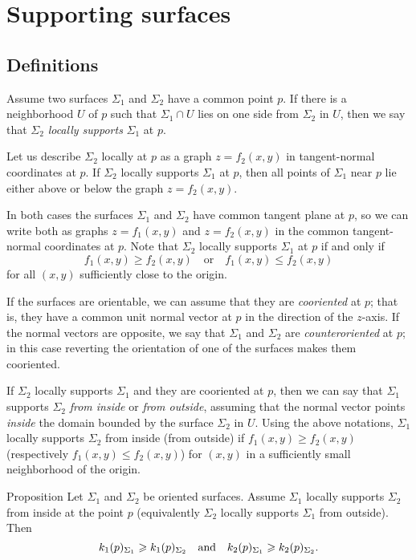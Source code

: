 \chapter{Supporting surfaces}
\label{chap:surface-support}

\section{Definitions}

Assume two surfaces $\Sigma_1$ and $\Sigma_2$ have a common point $p$.
If there is a neighborhood $U$ of $p$ such that $\Sigma_1\cap U$ lies on one side from $\Sigma_2$ in $U$, then we say that $\Sigma_2$ \emph{locally supports} $\Sigma_1$ at $p$.

Let us describe $\Sigma_2$ locally at $p$ as a graph $z=f_2(x,y)$ in tangent-normal coordinates at $p$.
If $\Sigma_2$ locally supports $\Sigma_1$ at $p$, then  all points of $\Sigma_1$ near $p$ lie either above or below the graph $z=f_2(x,y)$.

In both cases the surfaces $\Sigma_1$ and $\Sigma_2$ have common tangent plane at $p$,
so we can write both as graphs $z=f_1(x,y)$ and $z=f_2(x,y)$ in the common tangent-normal coordinates at $p$.
Note that $\Sigma_2$ locally supports $\Sigma_1$ at $p$ if and only if 
\[f_1(x,y)\ge f_2(x,y)
\quad\text{or}\quad
f_1(x,y)\le f_2(x,y)\]
for all $(x,y)$ sufficiently close to the origin.

If the surfaces are orientable, we can assume that they are \emph{cooriented} at $p$;
that is, they have a common unit normal vector at $p$ in the direction of the $z$-axis.
If the normal vectors are opposite, we say that $\Sigma_1$ and $\Sigma_2$ are \emph{counteroriented} at $p$;
in this case reverting the orientation of one of the surfaces makes them cooriented.

If $\Sigma_2$ locally supports $\Sigma_1$ and they are cooriented at $p$,
then we can say that $\Sigma_1$ supports $\Sigma_2$ \emph{from inside} or \emph{from outside},
assuming that the normal vector points {}\emph{inside} the domain bounded by the surface $\Sigma_2$ in $U$.
Using the above notations, $\Sigma_1$ locally supports $\Sigma_2$ from inside (from outside)  if $f_1(x,y)\ge f_2(x,y)$ (respectively $f_1(x,y)\le f_2(x,y)$) for $(x,y)$ in a sufficiently small neighborhood of the origin.

\begin{thm}{Proposition}\label{prop:surf-support}
Let $\Sigma_1$ and $\Sigma_2$ be oriented surfaces.
Assume $\Sigma_1$ locally supports $\Sigma_2$ from inside at the point $p$ (equivalently $\Sigma_2$ locally supports $\Sigma_1$ from outside).
Then 
\[k_1(p)_{\Sigma_1}\ge k_1(p)_{\Sigma_2}\quad\text{and}\quad k_2(p)_{\Sigma_1}\z\ge k_2(p)_{\Sigma_2}.\]
\end{thm}

